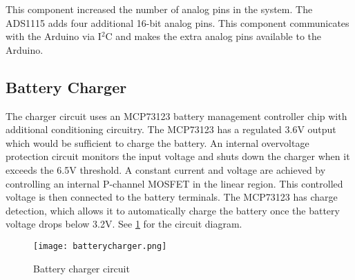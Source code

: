 This component increased the number of analog pins in the system. The ADS1115 adds four additional 16-bit analog pins. This component communicates with the Arduino via I$^2$C and makes the extra analog pins available to the Arduino.

\subsection{Battery Charger}
The charger circuit uses an MCP73123 battery management controller chip with additional conditioning circuitry. The MCP73123 has a regulated 3.6V output which would be sufficient to charge the battery. An internal overvoltage protection circuit monitors the input voltage and shuts down the charger when it exceeds the 6.5V threshold. A constant current and voltage are achieved by controlling an internal P-channel MOSFET in the linear region. This controlled voltage is then connected to the battery terminals. The MCP73123 has charge detection, which allows it to automatically charge the battery once the battery voltage drops below 3.2V. See \ref{fig:charger} for the circuit diagram.

\begin{figure}[!h]
    \centering
    \texttt{[image: batterycharger.png]}
    \caption{Battery charger circuit}
    \label{fig:charger}
\end{figure}